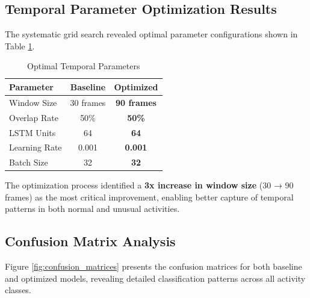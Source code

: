 \documentclass[a4paper,11pt]{article}
\begin{document}
\subsection{Temporal Parameter Optimization Results}

The systematic grid search revealed optimal parameter configurations shown in Table \ref{tab:optimal_params}.

\begin{table}[H]
\centering
\caption{Optimal Temporal Parameters}
\label{tab:optimal_params}
\begin{tabular}{lcc}
\toprule
\textbf{Parameter} & \textbf{Baseline} & \textbf{Optimized} \\
\midrule
Window Size & 30 frames & \textcolor{improvement}{\textbf{90 frames}} \\
Overlap Rate & 50\% & \textcolor{improvement}{\textbf{50\%}} \\
LSTM Units & 64 & \textcolor{improvement}{\textbf{64}} \\
Learning Rate & 0.001 & \textcolor{improvement}{\textbf{0.001}} \\
Batch Size & 32 & \textcolor{improvement}{\textbf{32}} \\
\bottomrule
\end{tabular}
\end{table}

The optimization process identified a \textcolor{improvement}{\textbf{3x increase in window size}} (30 → 90 frames) as the most critical improvement, enabling better capture of temporal patterns in both normal and unusual activities.

\subsection{Confusion Matrix Analysis}

Figure \ref{fig:confusion_matrices} presents the confusion matrices for both baseline and optimized models, revealing detailed classification patterns across all activity classes.
\end{document}
